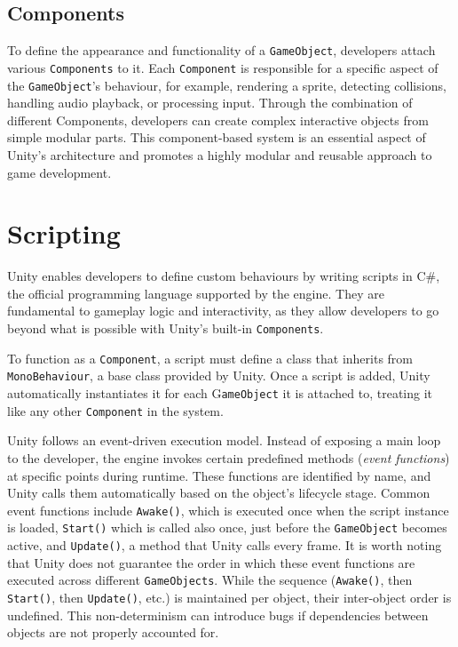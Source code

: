 \subsection{Components}
To define the appearance and functionality of a \verb|GameObject|, developers attach various \verb|Components| to it. Each \verb|Component| is responsible for a specific aspect of the \verb|GameObject|’s behaviour, for example, rendering a sprite, detecting collisions, handling audio playback, or processing input. Through the combination of different Components, developers can create complex interactive objects from simple modular parts. This component-based system is an essential aspect of Unity’s architecture and promotes a highly modular and reusable approach to game development. 

\section{Scripting}
Unity enables developers to define custom behaviours by writing scripts in C\#, the official programming language supported by the engine. They are fundamental to gameplay logic and interactivity, as they allow developers to go beyond what is possible with Unity’s built-in \verb|Components|.

To function as a \verb|Component|, a script must define a class that inherits from \verb|MonoBehaviour|, a base class provided by Unity. Once a script is added, Unity automatically instantiates it for each G\verb|ameObject| it is attached to, treating it like any other \verb|Component| in the system.

Unity follows an event-driven execution model. Instead of exposing a main loop to the developer, the engine invokes certain predefined methods (\textit{event functions}) at specific points during runtime. These functions are identified by name, and Unity calls them automatically based on the object’s lifecycle stage. Common event functions include \verb|Awake()|, which is executed once when the script instance is loaded, \verb|Start()| which is called also once, just before the \verb|GameObject| becomes active, and \verb|Update()|, a method that Unity calls every frame. It is worth noting that Unity does not guarantee the order in which these event functions are executed across different \verb|GameObjects|. While the sequence (\verb|Awake()|, then \verb|Start()|, then \verb|Update()|, etc.) is maintained per object, their inter-object order is undefined. This non-determinism can introduce bugs if dependencies between objects are not properly accounted for.

